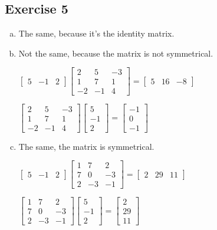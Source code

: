 \documentclass[11pt]{article}
\begin{document}
\subsection{Exercise 5}

\begin{enumerate}[a.]
	\item %
	The same, because it's the identity matrix.
	\item %
	Not the same, because the matrix is not symmetrical.
	
	$\begin{bmatrix}
	 5 & -1 & 2
	\end{bmatrix}
	\begin{bmatrix}
		2 & 5 & -3 \\
		1 & 7 & 1 \\
		-2 & -1 & 4
	\end{bmatrix}=
	\begin{bmatrix}
		5 & 16 & -8
	\end{bmatrix}$
	
	$\begin{bmatrix}
		2 & 5 & -3 \\
		1 & 7 & 1 \\
		-2 & -1 & 4
	\end{bmatrix}
	\begin{bmatrix}
		5 \\ -1 \\ 2
	\end{bmatrix}=
	\begin{bmatrix}
		-1 \\ 0 \\ -1
	\end{bmatrix}$
	
	\item %
	The same, the matrix is symmetrical.
	
	$\begin{bmatrix}
		5 & -1 & 2
	\end{bmatrix}
	\begin{bmatrix}
		1 & 7 & 2 \\
		7 & 0 & -3 \\
		2 & -3 & -1
	\end{bmatrix}=
	\begin{bmatrix}
		2 & 29 & 11
	\end{bmatrix}$
	
	$\begin{bmatrix}
		1 & 7 & 2 \\
		7 & 0 & -3 \\
		2 & -3 & -1
	\end{bmatrix}
	\begin{bmatrix}
		5 \\ -1 \\ 2
	\end{bmatrix}=
	\begin{bmatrix}
		2 \\ 29 \\ 11
	\end{bmatrix}$	
	

\end{enumerate}
\end{document}

